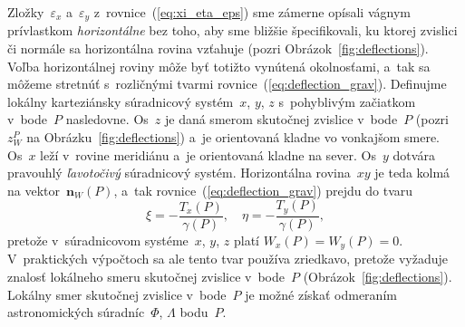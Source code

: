 \documentclass[a4paper,12pt]{book}
\let\vec\mathbf
\begin{document}
Zložky~$\varepsilon_x$ a~$\varepsilon_y$ z~rovnice~(\ref{eq:xi_eta_eps}) sme 
zámerne opísali vágnym prívlastkom \emph{horizontálne} bez toho, aby sme 
bližšie špecifikovali, ku ktorej zvislici či normále sa horizontálna rovina 
vzťahuje (pozri Obrázok~\ref{fig:deflections}).  Voľba horizontálnej roviny 
môže byť totižto vynútená okolnosťami, a~tak sa môžeme stretnúť s~rozličnými 
tvarmi rovnice~(\ref{eq:deflection_grav}).  Definujme lokálny karteziánsky 
súradnicový systém~$x$, $y$, $z$ s~pohyblivým začiatkom v~bode~$P$ nasledovne.  
Os~$z$ je daná smerom skutočnej zvislice v~bode~$P$ (pozri~$z_W^P$ na 
Obrázku~\ref{fig:deflections}) a~je orientovaná kladne vo vonkajšom smere.  
Os~$x$ leží v~rovine meridiánu a~je orientovaná kladne na sever.  Os~$y$ 
dotvára pravouhlý \emph{ľavotočivý} súradnicový systém.  Horizontálna 
rovina~$xy$ je teda kolmá na vektor~$\vec n_W(P)$, a~tak 
rovnice~(\ref{eq:deflection_grav}) prejdu do tvaru \parencite{Borre_chapter4}
%
\begin{equation}
\label{eq:deflection_grav_nat}
\xi = -\frac{T_x(P)}{\gamma(P)}{,} \quad \eta = -\frac{T_y(P)}{\gamma(P)}{,}
\end{equation}
%
pretože v~súradnicovom systéme~$x$, $y$, $z$ platí $W_x(P) = W_y(P) = 0$.  
V~praktických výpočtoch sa ale tento tvar používa zriedkavo, pretože vyžaduje 
znalosť lokálneho smeru skutočnej zvislice v~bode~$P$ 
(Obrázok~\ref{fig:deflections}).  Lokálny smer skutočnej zvislice v~bode~$P$ je 
možné získať odmeraním astronomických súradníc~$\Phi$, $\Lambda$ bodu~$P$.
\end{document}

